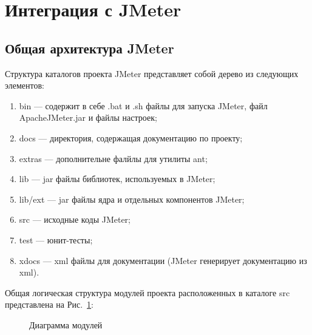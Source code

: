 \section{Интеграция с JMeter}

\subsection{Общая архитектура JMeter}

Структура каталогов проекта JMeter представляет собой дерево из следующих элементов:

\begin{enumerate}
\item bin --- содержит в себе .bat и .sh файлы для запуска JMeter, файл ApacheJMeter.jar и файлы настроек;
\item docs --- директория, содержащая документацию по проекту;
\item extras --- дополнительне фалйлы для утилиты ant;
\item lib --- jar файлы библиотек, используемых в JMeter;
\item lib/ext --- jar файлы ядра и отдельных компонентов JMeter;
\item src --- исходные коды JMeter;
\item test --- юнит-тесты;
\item xdocs --- xml файлы для документации (JMeter генерирует документацию из xml).
\end{enumerate}

Общая логическая структура модулей проекта расположенных в каталоге src
представлена на Рис.~\ref{ris:Diagram3.png}:

\begin{figure}[ht]
\caption{Диаграмма модулей}
\label{ris:Diagram3.png}
\end{figure}

